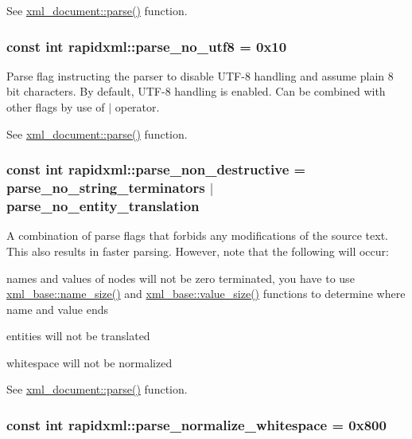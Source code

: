 \par
 See \hyperlink{classrapidxml_1_1xml__document_ad510b0c5fd8bf0180a55ffb2476e59e4}{xml\_\-document::parse()} function. \hypertarget{namespacerapidxml_a22d4aefaceb00d7afabfef7107b108da}{
\subsubsection[{parse\_\-no\_\-utf8}]{\setlength{\rightskip}{0pt plus 5cm}const int {\bf rapidxml::parse\_\-no\_\-utf8} = 0x10}}
\label{d7/d8a/namespacerapidxml_a22d4aefaceb00d7afabfef7107b108da}
Parse flag instructing the parser to disable UTF-\/8 handling and assume plain 8 bit characters. By default, UTF-\/8 handling is enabled. Can be combined with other flags by use of $|$ operator. \par
\par
 See \hyperlink{classrapidxml_1_1xml__document_ad510b0c5fd8bf0180a55ffb2476e59e4}{xml\_\-document::parse()} function. \hypertarget{namespacerapidxml_a45d4d8fef551beaaba23a83b847fd6a3}{
\subsubsection[{parse\_\-non\_\-destructive}]{\setlength{\rightskip}{0pt plus 5cm}const int {\bf rapidxml::parse\_\-non\_\-destructive} = {\bf parse\_\-no\_\-string\_\-terminators} $|$ {\bf parse\_\-no\_\-entity\_\-translation}}}
\label{d7/d8a/namespacerapidxml_a45d4d8fef551beaaba23a83b847fd6a3}
A combination of parse flags that forbids any modifications of the source text. This also results in faster parsing. However, note that the following will occur: 
\begin{DoxyItemize}
\item names and values of nodes will not be zero terminated, you have to use \hyperlink{classrapidxml_1_1xml__base_a7e7f98b3d01e1eab8dc1ca69aad9af84}{xml\_\-base::name\_\-size()} and \hyperlink{classrapidxml_1_1xml__base_a9fcf201ed0915ac18dd43b0b5dcfaf32}{xml\_\-base::value\_\-size()} functions to determine where name and value ends 
\item entities will not be translated 
\item whitespace will not be normalized 
\end{DoxyItemize}See \hyperlink{classrapidxml_1_1xml__document_ad510b0c5fd8bf0180a55ffb2476e59e4}{xml\_\-document::parse()} function. \hypertarget{namespacerapidxml_a31f33885defb5176a7d99e524c35d386}{
\subsubsection[{parse\_\-normalize\_\-whitespace}]{\setlength{\rightskip}{0pt plus 5cm}const int {\bf rapidxml::parse\_\-normalize\_\-whitespace} = 0x800}}
